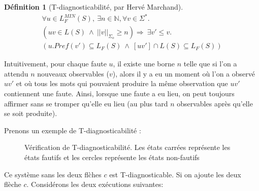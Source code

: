\documentclass[conference]{IEEEtran}
\newtheorem{mydef}{D\'efinition}
\begin{document}
\begin{mydef}[T-diagnosticabilité, par Hervé Marchand]

$$\begin{array}{l}
\forall u \in L^{MIN}_F(S),\ \exists n \in \mathbb{N}, \forall v \in \Sigma^*.\\
(uv \in L(S) \ \wedge \  ||v||_{\Sigma_o}\geq n) \Rightarrow \ \exists v' \leq v. \\
(u.Pref(v') \subseteq L_F(S) \ \wedge \  [uv'] \cap L(S) \subseteq L_F(S))
\end{array}$$
\end{mydef}

Intuitivement, pour chaque faute $u$, il existe une borne $n$ telle que si l'on a attendu $n$ nouveaux observables ($v$), alors il y a eu un moment où l'on a observé $uv'$ et où tous les mots qui pouvaient produire la m\^eme observation que $uv'$ contiennent une faute. Ainsi, lorsque une faute a eu lieu, on peut toujours affirmer sans se tromper qu'elle eu lieu (au plus tard $n$ observables après qu'elle se soit produite).

Prenons un exemple de T-diagnosticabilit\'e :

\begin{figure}[H]
  \caption{V\'erification de T-diagnosticabilit\'e. Les \'etats carr\'ees repr\'esente les \'etats fautifs et les cercles repr\'esente les \'etats non-fautifs}
  \begin{center}
  \end{center}
\end{figure}

Ce syst\`eme sans les deux fl\`ches $c$ est T-diagnosticable. Si on ajoute les deux fl\`eche $c$. Consid\'erons les deux ex\'ecutions suivantes:
\end{document}
